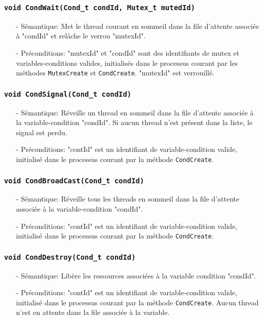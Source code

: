 \documentclass[11pt]{article}
\theoremstyle{definition}
\theoremstyle{definition}
\begin{document}
\subsubsection{\texttt{void CondWait(Cond\_t condId, Mutex\_t mutedId)}}
\begin{itemize}
\item[-]Sémantique: Met le thread courant en sommeil dans la file d'attente associée à "condId" et
  relâche le verrou "mutexId".
\item[-]Préconditions: "mutexId" et "condId" sont des identifiants de mutex et variables-conditions
  valides, initialisés dans le processus courant par les méthodes \texttt{MutexCreate} et \texttt{CondCreate}.
  "mutexId" est verrouillé.
\end{itemize}

\subsubsection{\texttt{void CondSignal(Cond\_t condId)}}
\begin{itemize}
\item[-]Sémantique: Réveille un thread en sommeil dans la file d'attente associée à la variable-condition
  "condId". Si aucun thread n'est présent dans la liste, le signal est perdu.
\item[-]Préconditions: "contId" est un identifiant de variable-condition valide, initialisé dans le processus
  courant par la méthode \texttt{CondCreate}.
\end{itemize}

\subsubsection{\texttt{void CondBroadCast(Cond\_t condId)}}
\begin{itemize}
\item[-]Sémantique: Réveille tous les threads en sommeil dans la file d'attente associée à la
  variable-condition "condId".
\item[-]Préconditions: "contId" est un identifiant de variable-condition valide, initialisé dans le processus
  courant par la méthode \texttt{CondCreate}.
\end{itemize}

\subsubsection{\texttt{void CondDestroy(Cond\_t condId)}}
\begin{itemize}
\item[-]Sémantique: Libère les ressources associées à la variable condition "condId". 
\item[-]Préconditions: "contId" est un identifiant de variable-condition valide, initialisé dans le processus
  courant par la méthode \texttt{CondCreate}. Aucun thread n'est en attente dans la file associée à la variable.
\end{itemize}
\end{document}
